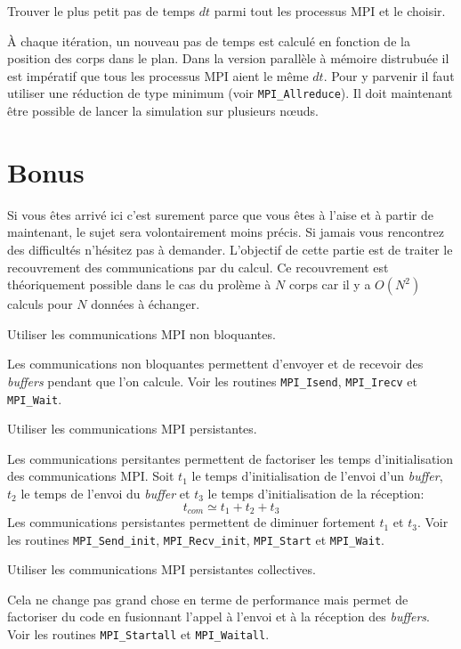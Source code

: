 \begin{questions}
	\question Trouver le plus petit pas de temps $dt$ parmi tout les processus MPI et le choisir.
	\begin{solution}
		À chaque itération, un nouveau pas de temps est calculé en fonction de la position des corps dans le plan.
		Dans la version parallèle à mémoire distrubuée il est impératif que tous les processus MPI aient le même $dt$.
		Pour y parvenir il faut utiliser une réduction de type minimum (voir \texttt{MPI\_Allreduce}).
		Il doit maintenant être possible de lancer la simulation sur plusieurs n\oe uds.
	\end{solution}
\end{questions}

\section{Bonus}
Si vous êtes arrivé ici c'est surement parce que vous êtes à l'aise et à partir de maintenant, le sujet sera volontairement moins précis.
Si jamais vous rencontrez des difficultés n'hésitez pas à demander.
L'objectif de cette partie est de traiter le recouvrement des communications par du calcul.
Ce recouvrement est théoriquement possible dans le cas du prolème à $N$ corps car il y a $O(N^2)$ calculs pour $N$ données à échanger.\\

\begin{questions}
	\question Utiliser les communications MPI non bloquantes.
	\begin{solution}
		Les communications non bloquantes permettent d'envoyer et de recevoir des \textit{buffers} pendant que l'on calcule.
		Voir les routines \texttt{MPI\_Isend}, \texttt{MPI\_Irecv} et \texttt{MPI\_Wait}.
	\end{solution}

	\question Utiliser les communications MPI persistantes.
	\begin{solution}
		Les communications persitantes permettent de factoriser les temps d'initialisation des communications MPI.
		Soit $t_1$ le temps d'initialisation de l'envoi d'un \textit{buffer}, $t_2$ le temps de l'envoi du \textit{buffer} et $t_3$ le temps d'initialisation de la réception:
		\begin{equation*}
			t_{com} \simeq t_1 + t_2 + t_3
		\end{equation*}
		Les communications persistantes permettent de diminuer fortement $t_1$ et $t_3$.
		Voir les routines \texttt{MPI\_Send\_init}, \texttt{MPI\_Recv\_init}, \texttt{MPI\_Start} et \texttt{MPI\_Wait}.
	\end{solution}

	\question Utiliser les communications MPI persistantes collectives.
	\begin{solution}
		Cela ne change pas grand chose en terme de performance mais permet de factoriser du code en fusionnant l'appel à l'envoi et à la réception des \textit{buffers}.
		Voir les routines \texttt{MPI\_Startall} et \texttt{MPI\_Waitall}.
	\end{solution}
\end{questions}
